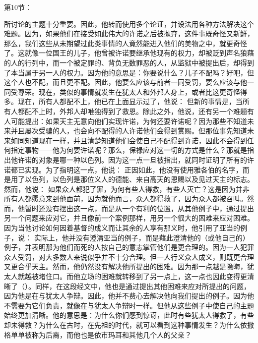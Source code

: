 第10节：\par

所讨论的主题十分重要。因此，他转而使用多个论证，并设法用各种方法解决这个难题。因为，如果他们在接受如此伟大的许诺之后被抛弃，这件事既奇怪又新鲜，那么，我们这些从未期望过此类事情的人竟然能进入他们的美物之中，就更奇怪了。这就像一位国王的儿子，他曾被许诺要继承他现有的权力，却被贬到声名狼藉的人的行列中，而一个被定罪的、背负无数罪恶的人，从监狱中被提出后，却得到了本当属于另一人的权力。因为他的意思是：你要说什么？儿子不配吗？好吧，但这个人也不配，而且更不配。因此，他要么应该与前者一同受罚，要么应该与他一同受尊荣。现在，类似的事情就发生在犹太人和外邦人身上，或者比这更奇怪得多。现在，所有人都配不上，他已在上面显示过了，他说： 但新的事情是，当所有人都配不上时，外邦人却唯独得到了救恩。除此之外，他说，还有另一个难题有人可能提出：如果天主无意向他们实现许诺，为何还要许诺呢？因为那些不知道未来并且屡次受骗的人，也会向不配得的人许诺他们会得到赏赐。但那位事先知道未来如同知道现在一样，并且清楚知道他们会使自己不配得到许诺，因此不会得到任何指定事物——他为何要许诺呢？那么，保禄应对这一切的方式是什么？那就是指出他许诺的对象是哪一种以色列。因为这一点一旦被指出，就同时证明了所有的许诺都已实现。为了指明这一点，他说： 正因如此，他没有使用雅各伯的名字，而是用了以色列，以色列是那位义人的德能、来自高天的恩赐以及见过天主的标志。 然而，他说： 如果众人都犯了罪，为何有些人得救，有些人灭亡？这是因为并非所有人都愿意来到他面前，因为就他而言，众人都得救了，因为众人都被召叫。然而，他暂时还没有摆出这一点，而是从一个有利的位置，从其他例子中，通过提出另一个问题来应对它，并且像前一个案例那样，用另一个很大的困难来应对困难。因为当他讨论如何因着基督的成义而让其余的人享有那义时，他引用了亚当的例子，说： 实际上，他并没有澄清亚当的例子，而是藉此澄清他的（或他自己的）例子，并表明那为他们而死的人按自己的意志掌管他们是更合理的。因为一人犯罪众人受罚，对大多数人来说似乎并不十分合理。但一人行义众人成义，则既更合理又更合乎天主。然而，他仍然没有解决他所提出的困难。因为那一点越是隐晦，犹太人就越被堵住口。而他立场的困难就转移到了另一点上，这一点也因此变得更清晰了（）。同样，在这段经文中，他也是通过提出其他困难来应对所提出的问题，因为他是在与犹太人争辩。因此，他并不费心去解决他向我们提出的例子。因为他不需要为它们负责，就像在与犹太人争辩时一样。但他从这些例子中使自己的主题始终更加清晰。他的意思是：为什么你们感到惊讶，此时有些犹太人得救了，有些却未得救？为什么在古时，在先祖的时代，就可以看到这种事情发生？为什么依撒格单单被称为后裔，而他也是依市玛耳和其他几个人的父亲？ 